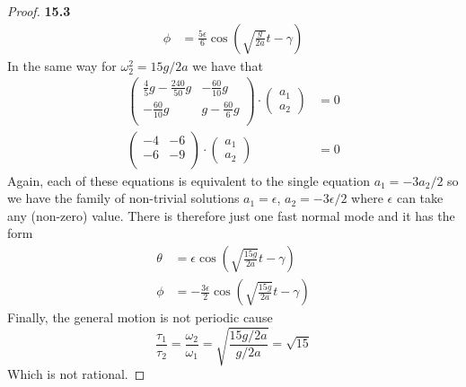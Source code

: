 \documentclass[11pt]{article}
\theoremstyle{definition}
\begin{document}
\begin{proof}{\textbf{15.3}}
\begin{align*}
        \phi &= \frac{5\epsilon}{6} \cos(\sqrt{\frac{g}{2a}}t - \gamma)
    \end{align*}
    In the same way for $\omega_2^2 = 15g/2a$ we have that
    \begin{align*}
        \begin{pmatrix}
            \frac{4}{5}g -\frac{240}{50}g & -\frac{60}{10}g\\
            -\frac{60}{10}g & g -\frac{60}{6}g\\
        \end{pmatrix}\cdot
        \begin{pmatrix}
            a_1\\ a_2
        \end{pmatrix}
        &= 0\\
        \begin{pmatrix}
            -4 & -6\\
            -6 & -9\\
        \end{pmatrix}\cdot
        \begin{pmatrix}
            a_1\\ a_2
        \end{pmatrix}
        &= 0
    \end{align*}
    Again, each of these equations is equivalent to the single equation
    $a_1 = -3a_2/2$
    so we have the family of non-trivial solutions $a_1 = \epsilon$,
    $a_2 = -3\epsilon/2$ where $\epsilon$ can take any (non-zero) value.
    There is therefore just one fast normal mode and it has the form
    \begin{align*}
        \theta &= \epsilon \cos(\sqrt{\frac{15g}{2a}}t - \gamma)\\
        \phi &= -\frac{3\epsilon}{2} \cos(\sqrt{\frac{15g}{2a}}t - \gamma)
    \end{align*}
    Finally, the general motion is not periodic cause 
    $$\frac{\tau_1}{\tau_2} = \frac{\omega_2}{\omega_1} = \sqrt{\frac{15g/2a}{g/2a}} = \sqrt{15}$$
    Which is not rational.
\end{proof}
\cleardoublepage
\end{document}
